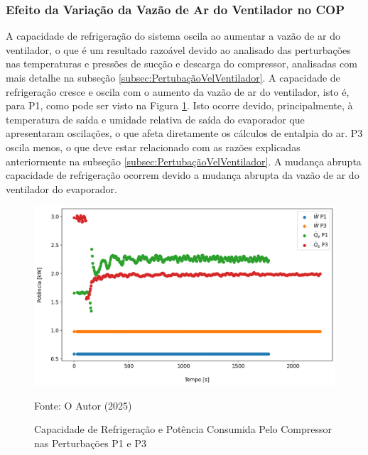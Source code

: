\subsubsection{Efeito da Variação da Vazão de Ar do Ventilador no COP}

A capacidade de refrigeração do sistema oscila ao aumentar a vazão de ar do ventilador, o que é um resultado razoável devido ao analisado das perturbações nas temperaturas e pressões de sucção e descarga do compressor, analisadas com mais detalhe na subseção \ref{subsec:PertubaçãoVelVentilador}. A capacidade de refrigeração cresce e oscila com o aumento da vazão de ar do ventilador, isto é, para P1, como pode ser visto na Figura \ref{fig:Qe e W Perturbação Ventilador}. Isto ocorre devido, principalmente, à temperatura de saída e umidade relativa de saída do evaporador que apresentaram oscilações, o que afeta diretamente os cálculos de entalpia do ar. P3 oscila menos, o que deve estar relacionado com as razões explicadas anteriormente na subseção \ref{subsec:PertubaçãoVelVentilador}. A mudança abrupta capacidade de refrigeração ocorrem devido a mudança abrupta da vazão de ar do ventilador do evaporador.

\begin{figure}[h]
    \centering
    \includegraphics[width=1\linewidth]{FigurasdoTexto/Qe e W Perturbação Ventilador.png}
    \caption{Capacidade de Refrigeração e Potência Consumida Pelo Compressor nas Perturbações P1 e P3}
    \label{fig:Qe e W Perturbação Ventilador}
    {\footnotesize Fonte: O Autor (2025)}
\end{figure}

